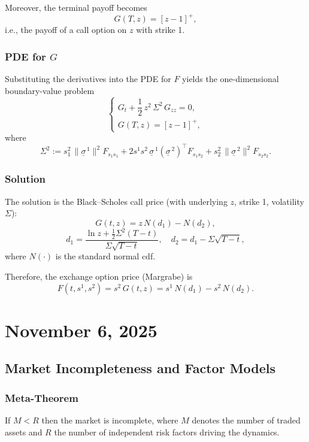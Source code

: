 \documentclass[12pt,a4paper]{article}
\theoremstyle{definition}
\begin{document}
Moreover, the terminal payoff becomes
\[
G(T, z) = [z - 1]^+,
\]
i.e., the payoff of a call option on $z$ with strike 1.

\subsubsection{PDE for $G$}

Substituting the derivatives into the PDE for $F$ yields the one-dimensional boundary-value problem
\[
\begin{cases}
G_t + \dfrac{1}{2} \, z^2 \, \Sigma^2 \, G_{zz} = 0, \\[0.5em]
G(T, z) = [z - 1]^+,
\end{cases}
\]
where
\[
\Sigma^2 := s_1^2 \, \|\underline{\sigma}^{\,1}\|^2 F_{s_1 s_1} + 2 s^1 s^2 \, \underline{\sigma}^{\,1} (\underline{\sigma}^{\,2})^\top F_{s_1 s_2} + s_2^2 \, \|\underline{\sigma}^{\,2}\|^2 F_{s_2 s_2}.
\]

\subsubsection{Solution}

The solution is the Black--Scholes call price (with underlying $z$, strike 1, volatility $\Sigma$):
\[
G(t, z) = z \, N(d_1) - N(d_2),
\]
\[
d_1 = \frac{\ln z + \frac{1}{2}\Sigma^2(T-t)}{\Sigma\sqrt{T-t}}, \quad d_2 = d_1 - \Sigma\sqrt{T-t},
\]
where $N(\cdot)$ is the standard normal cdf.

Therefore, the exchange option price (Margrabe) is
\[
F(t, s^1, s^2) = s^2 \, G(t, z) = s^1 \, N(d_1) - s^2 \, N(d_2).
\]

\newpage
\section{November 6, 2025}

\subsection{Market Incompleteness and Factor Models}

\subsubsection{Meta-Theorem}

If $M < R$ then the market is incomplete, where $M$ denotes the number of traded assets and $R$ the number of independent risk factors driving the dynamics.
\end{document}
